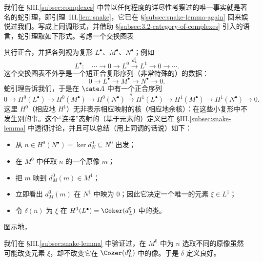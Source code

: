 我们在 §III.\ref{subsec:complexes} 中曾以任何程度的详尽性考察过的唯一事实就是著名的蛇引理，即引理~III.\ref{lem:snake}，它已在 \S\ref{subsec:snake-lemma-again} 回来娱悦过我们。写成上同调形式，并借助 \S\ref{subsec:3.2-category-of-complexes} 引入的语言，蛇引理取如下形式。考虑一个交换图表
\begin{center}
\end{center}
其行正合，并把各列视为复形 $L^\bullet$、$M^\bullet$、$N^\bullet$；例如
\[
L^\bullet:\quad \cdots\longrightarrow0\longrightarrow L^0\xrightarrow{d_L^0}L^1\longrightarrow0\longrightarrow\cdots.
\]这个交换图表不外乎是一个短正合复形序列（非常特殊的）的数据：
\[
0\longrightarrow L^\bullet\longrightarrow M^\bullet\longrightarrow N^\bullet\longrightarrow 0.
\]
蛇引理告诉我们，于是在 $\cate A$ 中有一个正合序列
\[
0\longrightarrow H^0(L^\bullet)\longrightarrow H^0(M^\bullet)\longrightarrow H^0(N^\bullet)\xrightarrow{\delta} H^1(L^\bullet)\longrightarrow H^1(M^\bullet)\longrightarrow H^1(N^\bullet)\longrightarrow0.
\]
这里 $H^0$（相应地 $H^1$）无非表示相应映射的核（相应地余核）：在这些小复形中不发生别的事。这个“连接”态射的（基于元素的）定义已在 §III.\ref{subsec:snake-lemma} 中透彻讨论，并且可以总结（用上同调的话说）如下：
\begin{itemize}
\item 从 $n\in H^0(N^\bullet)=\ker d_N^0\subseteq N^0$ 出发；
\item 在 $M^0$ 中任取 $n$ 的一个原像 $m$；
\item 把 $m$ 映到 $d_M^0(m)\in M^1$；
\item 立即看出 $d_M^0(m)$ 在 $N^1$ 中映为 $0$；因此它决定一个唯一的元素 $\xi\in L^1$；
\item 令 $\delta(n)$ 为 $\xi$ 在 $H^1(L^\bullet)=\Coker(d_L^0)$ 中的类。
\end{itemize}
图示地，
\begin{center}
\end{center}
我们在 §III.\ref{subsec:snake-lemma} 中验证过，在 $M^0$ 中为 $n$ 选取不同的原像虽然可能改变元素 $\xi$，却不改变它在 $\Coker(d_L^0)$ 中的像。于是 $\delta$ 定义良好。

